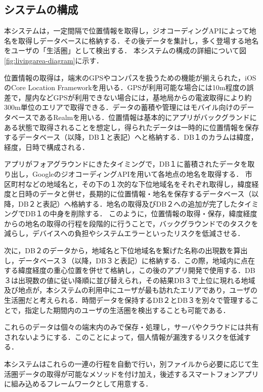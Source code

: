 \documentclass[a4paper]{jsarticle}
\begin{document}
\subsection{システムの構成}
本システムは，一定間隔で位置情報を取得し，ジオコーディングAPIによって地名を取得しデータベースに格納する．その後データを集計し，多く登場する地名をユーザの「生活圏」として検出する．
本システムの構成の詳細について図\ref{fig:livingarea-diagram}に示す．

位置情報の取得は，端末のGPSやコンパスを扱うための機能が揃えられた，iOSのCore Location Frameworkを用いる．GPSが利用可能な場合には10m程度の誤差で，屋内などGPSが利用できない場合には，基地局からの電波取得により約300m単位のエリアで取得できる．データの蓄積や管理にはモバイル向けのデータベースであるRealmを用いる．位置情報は基本的にアプリがバックグランドにある状態で取得されることを想定し，得られたデータは一時的に位置情報を保存するデータベース（以降，DB１と表記）へと格納する．DB１のカラムは緯度，経度，日時で構成される．

アプリがフォアグラウンドにきたタイミングで，DB１に蓄積されたデータを取り出し，GoogleのジオコーディングAPIを用いて各地点の地名を取得する．
市区町村などの地域名と，その下の１次的な下位地域名をそれぞれ取得し，緯度経度と日時のデータと併せ，長期的に位置情報・地名を保存するデータベース（以降，DB２と表記）へ格納する．地名の取得及びDB２への追加が完了したタイミングでDB１の中身を削除する．
このように，位置情報の取得・保存，緯度経度からの地名の取得の行程を段階的に行うことで，バックグラウンドでのタスクを減らし，デバイスへの負担やシステムエラーといったリスクを低減させる．

次に，DB２のデータから，地域名と下位地域名を繋げた名称の出現数を算出し，データベース３（以降，DB３と表記）に格納する．この際，地域内に点在する緯度経度の重心位置を併せて格納し，この後のアプリ開発で使用する．DB３は出現数の値に従い降順に並び替えられ，その結果DB３で上位に現れる地域及び地点が，本システムの利用中にユーザが最も訪れたエリアであり，ユーザの生活圏だと考えられる．時間データを保持するDB２とDB３を別々で管理することで，指定した期間内のユーザの生活圏を検出することも可能である．

これらのデータは個々の端末内のみで保存・処理し，サーバやクラウドには共有されないようにする．このことによって，個人情報が漏洩するリスクを低減する．

本システムはこれらの一連の行程を自動で行い，別ファイルから必要に応じて生活圏データの取得が可能なメソッドを付け加え，後述するスマートフォンアプリに組み込めるフレームワークとして用意する．
\end{document}
